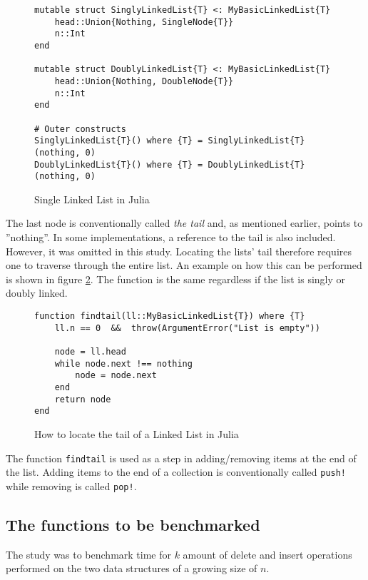 \documentclass[a4paper, 11pt]{article}
\begin{document}
    \begin{figure}[H]
        \centering
    \begin{verbatim}
mutable struct SinglyLinkedList{T} <: MyBasicLinkedList{T}
    head::Union{Nothing, SingleNode{T}}
    n::Int
end

mutable struct DoublyLinkedList{T} <: MyBasicLinkedList{T}
    head::Union{Nothing, DoubleNode{T}}
    n::Int
end

# Outer constructs
SinglyLinkedList{T}() where {T} = SinglyLinkedList{T}(nothing, 0)
DoublyLinkedList{T}() where {T} = DoublyLinkedList{T}(nothing, 0)
    \end{verbatim}
    \caption{Single Linked List in Julia}
    \label{code:SingleList}
    \end{figure}
   
    The last node is conventionally called \emph{the tail} and, as mentioned earlier, 
    points to ''nothing''. In some implementations, a reference to the tail is also included. 
    However, it was omitted in this study.
    Locating the lists' tail therefore requires one to traverse through the entire list.
    An example on how this can be performed is shown in figure \ref{code:findtail}. 
    The function is the same regardless if the list is singly or doubly linked.

    \begin{figure}[H]
    \centering
    \begin{verbatim}
function findtail(ll::MyBasicLinkedList{T}) where {T}
    ll.n == 0  &&  throw(ArgumentError("List is empty"))

    node = ll.head
    while node.next !== nothing
        node = node.next
    end
    return node
end
    \end{verbatim}
    \caption{How to locate the tail of a Linked List in Julia}
    \label{code:findtail}
    \end{figure}

    The function \texttt{findtail} is used as a step in
    adding/removing items at the end of the list. Adding items to the end of a collection 
    is conventionally called \texttt{push!} while removing is called \texttt{pop!}. 
     
    \subsection*{The functions to be benchmarked}
    The study was to benchmark time for $k$ amount of delete and insert operations performed on 
    the two data structures of a growing size of $n$. 
    
\end{document}

